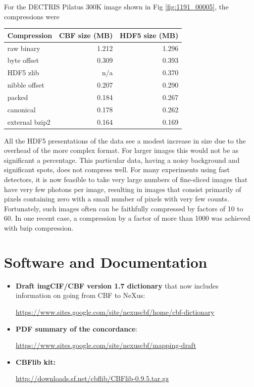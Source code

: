 \documentclass[11pt]{a0poster}
\begin{document}
\begin{minipage}[]{0.29\linewidth}
For the DECTRIS Pilatus 300K image shown in Fig \ref{fig:1191_00005}, the compressions
were
\vspace{-2mm}

\begin{center}
\begin{tabular}{|l|r|r|}
\hline
{\bf Compression}&{\bf CBF size (MB)}&{\bf HDF5 size (MB)}\\
\hline
raw binary&1.212&1.296\\
byte offset&0.309&0.393\\
HDF5 zlib& n/a &0.370\\
nibble offset&0.207&0.290\\
packed&0.184&0.267\\
canonical&0.178&0.262\\
external bzip2&0.164&0.169\\
\hline
\end{tabular}
\end{center}
\vspace{-2mm}

All the HDF5 presentations of the data see a modest increase in size due to the
overhead of the more complex format.  For larger images this would not be as significant
a percentage.  This particular data, having a noisy background and significant spots,
does not compress well.  For many experiments using fast detectors, it is now feasible
to take very large numbers of fine-sliced images that have very few photons per image, resulting
in images that consist primarily of pixels containing zero with a small number of pixels with
very few counts.  Fortunately, such images often can be faithfully compressed by factors of 
10 to 60.  In one recent case, a compression by a factor of more than 1000 was achieved
with bzip compression. 

\vspace{-5mm}%
\section*{Software and Documentation}

\vspace{-2mm}%
\begin{itemize}
\item{{\bf Draft imgCIF/CBF version 1.7 dictionary} that now includes information on going from CBF to NeXus:

{\fontsize{18}{22}\selectfont \url{https://www.sites.google.com/site/nexuscbf/home/cbf-dictionary}}
}

\item{{\bf PDF summary of the concordance}:

{\fontsize{18}{22}\selectfont \url{https://www.sites.google.com/site/nexuscbf/mapping-draft}}
}

\item{{\bf CBFlib kit:}

{\fontsize{18}{22}\selectfont \url{http://downloads.sf.net/cbflib/CBFlib-0.9.5.tar.gz}}
}
\end{itemize}
\end{minipage}%
\end{document}
